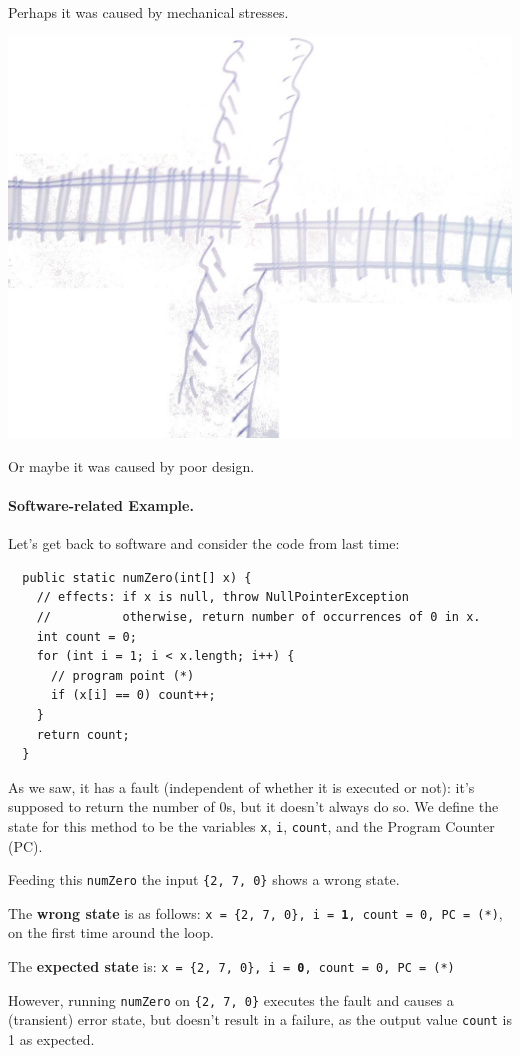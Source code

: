 \documentclass[11pt]{article}
\begin{document}
\newpage Perhaps it was caused by mechanical stresses.
\begin{center}
  \includegraphics[width=.7\textwidth]{L02/002_mechanical_fault}
\end{center}
Or maybe it was caused by poor design.

\paragraph{Software-related Example.}
Let's get back to software and consider the code from last time:
\begin{lstlisting}
  public static numZero(int[] x) {
    // effects: if x is null, throw NullPointerException
    //          otherwise, return number of occurrences of 0 in x.
    int count = 0;
    for (int i = 1; i < x.length; i++) {
      // program point (*)
      if (x[i] == 0) count++; 
    } 
    return count;
  }
\end{lstlisting}
As we saw, it has a fault (independent of whether it is executed
or not): it's supposed to return the number of 0s, but it doesn't
always do so.
We define the state for this method to be the variables {\tt x},
{\tt i}, {\tt count}, and the Program Counter (PC).

Feeding this {\tt numZero} the input {\tt \{2, 7, 0\}} shows a wrong state.

The {\bf wrong state} is as follows: {\tt x = \{2, 7, 0\}, i = {\bf 1}, count = 0, PC = (*)}, on the first time around the loop.

The {\bf expected state} is: {\tt x = \{2, 7, 0\}, i = {\bf 0}, count = 0, PC = (*)}

However, running {\tt numZero} on {\tt \{2, 7, 0\}} executes the fault
and causes a (transient) error state, but doesn't result in a failure,
as the output value {\tt count} is 1 as expected.
\end{document}
